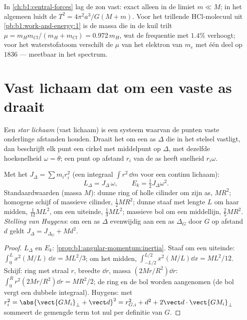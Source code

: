 \begin{example}\label{ex:b1:systems-of-points:reduced}
In \cref{ch:b1:central-forces} lag de zon vast: exact alleen in de
limiet $m \ll M$; in het algemeen luidt de  $T^2 = 4\pi^2a^3/G(M +
m)$. Voor het trillende HCl-molecuul uit \cref{pb:b1:work-and-energy:1}
is de massa die in de kuil trilt $\mu = m_Hm_{Cl}/(m_H + m_{Cl}) =
0.972\,m_H$, wat de frequentie met $1.4\%$ verhoogt; voor het
waterstofatoom verschilt de $\mu$ van het elektron van $m_e$ met één deel op $1836$ ---
meetbaar in het spectrum.
\end{example}

\section{Vast lichaam dat om een vaste as draait}

\begin{definition}\label{def:b1:systems-of-points:solid}
Een \emph{star lichaam} (vast lichaam) is een systeem waarvan de punten vaste
onderlinge afstanden houden. Draait het om een as $\Delta$ die in het stelsel
vastligt, dan beschrijft elk punt een cirkel met middelpunt op $\Delta$, met dezelfde
hoeksnelheid $\omega = \dot\theta$; een punt op afstand $r_i$ van de as heeft snelheid
$r_i\omega$.
\end{definition}

\begin{proposition}\label{prop:b1:systems-of-points:inertia}
Met het \emph{} $J_\Delta = \sum m_ir_i^2$ (een integraal
$\int r^2\,\dd m$ voor een continu lichaam):
\[
L_\Delta = J_\Delta\,\omega, \qquad E_k = \tfrac12 J_\Delta\omega^2 .
\]
Standaardwaarden (massa $M$): dunne ring of holle cilinder om zijn as,
$MR^2$; homogene schijf of massieve cilinder, $\tfrac12 MR^2$; dunne staaf met
lengte $L$ om haar midden, $\tfrac{1}{12}ML^2$, om een uiteinde,
$\tfrac13 ML^2$; massieve bol om een middellijn, $\tfrac25 MR^2$.
\emph{Stelling van Huygens}: om een as $\Delta$ evenwijdig aan een as
$\Delta_G$ door $G$ op afstand $d$ geldt $J_\Delta = J_{\Delta_G} + Md^2$.
\end{proposition}

\begin{proof}
$L_\Delta$ en $E_k$: \cref{prop:b1:angular-momentum:inertia}. Staaf om
een uiteinde: $\int_0^L x^2(M/L)\,\dd x = ML^2/3$; om het midden, $\int_{-L/2}^{L/2}
x^2(M/L)\dd x = ML^2/12$. Schijf: ring met straal $r$, breedte $\dd r$, massa
$(2Mr/R^2)\dd r$: $\int_0^R r^2(2Mr/R^2)\dd r = MR^2/2$; de ring en de
bol worden aangenomen (de bol vergt een dubbele integraal). Huygens: met
$r_i^2 = \abs{\vect{GM_i}_\perp + \vect d}^2 = r_{G,i}^2 + d^2 + 2\vect d\cdot
\vect{GM_i}_\perp$ sommeert de gemengde term tot nul per definitie van $G$.
\end{proof}


